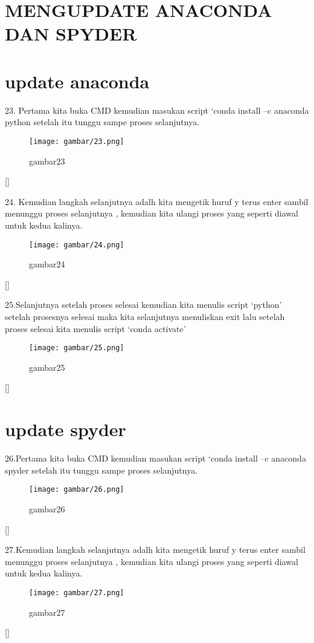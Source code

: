 \section{MENGUPDATE ANACONDA DAN SPYDER}
\section{update anaconda}
\item 23.  Pertama kita buka CMD kemudian masukan script ‘conda install –c anaconda python setelah itu tunggu sampe proses selanjutnya.
\begin{figure}[h]
    \centering
    \texttt{[image: gambar/23.png]}
    \caption{gambar23}
    \label{fig:my_label}
\end{figure}[]
\item 24.  Kemudian langkah selanjutnya adalh kita mengetik huruf y terus enter sambil menunggu proses selanjutnya , kemudian kita ulangi proses yang seperti diawal untuk kedua kalinya.
\begin{figure}[h]
    \centering
    \texttt{[image: gambar/24.png]}
    \caption{gambar24}
    \label{fig:my_label}
\end{figure}[]
\item 25.Selanjutnya setelah proses selesai kemudian kita menulis script ‘python’ setelah prosesnya selesai maka kita selanjutnya menuliskan exit lalu setelah proses selesai kita menulis script ‘conda activate’
\begin{figure}[h]
    \centering
    \texttt{[image: gambar/25.png]}
    \caption{gambar25}
    \label{fig:my_label}
\end{figure}[]
\section{update spyder}
\item 26.Pertama kita buka CMD kemudian masukan script ‘conda install –c anaconda spyder setelah itu tunggu sampe proses selanjutnya.
\begin{figure}[h]
    \centering
    \texttt{[image: gambar/26.png]}
    \caption{gambar26}
    \label{fig:my_label}
\end{figure}[]
\item 27.Kemudian langkah selanjutnya adalh kita mengetik huruf y terus enter sambil menunggu proses selanjutnya , kemudian kita ulangi proses yang seperti diawal untuk kedua kalinya.
\begin{figure}[h]
    \centering
    \texttt{[image: gambar/27.png]}
    \caption{gambar27}
    \label{fig:my_label}
\end{figure}[]
